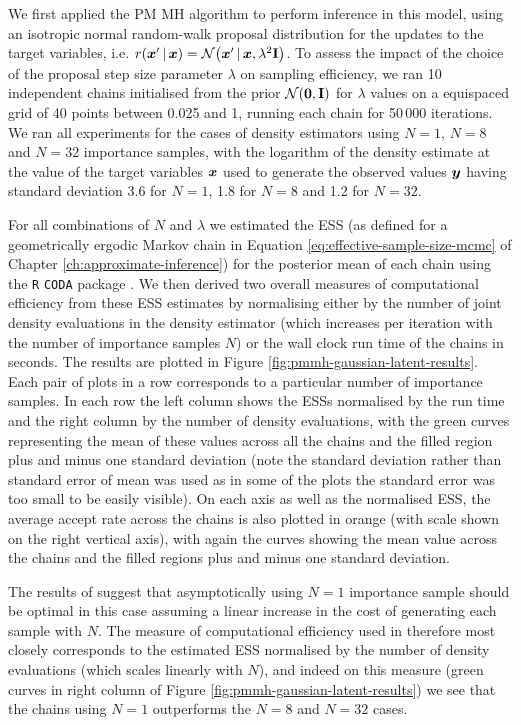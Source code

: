We first applied the \ac{PM} \ac{MH} algorithm to perform inference in this model, using an isotropic normal random-walk proposal distribution for the updates to the target variables, i.e. $r(\vct{x}'\gvn\vct{x}) = \nrm{\vct{x}'\gvn\vct{x},\lambda^2\mathbf{I}}$. To assess the impact of the choice of the proposal step size parameter $\lambda$ on sampling efficiency, we ran 10 independent chains initialised from the prior $\nrm{\vct{0},\mathbf{I}}$ for $\lambda$ values on a equispaced grid of 40 points between 0.025 and 1, running each chain for 50\,000 iterations. We ran all experiments for the cases of density estimators using $N=1$, $N=8$ and $N=32$ importance samples, with the logarithm of the density estimate at the value of the target variables $\boldsymbol{x}$ used to generate the observed values $\boldsymbol{y}$ having standard deviation 3.6 for $N=1$, 1.8 for $N=8$ and 1.2 for $N=32$.

For all combinations of $N$ and $\lambda$ we estimated the \acf{ESS} (as defined for a geometrically ergodic Markov chain in Equation \ref{eq:effective-sample-size-mcmc} of Chapter \ref{ch:approximate-inference}) for the posterior mean of each chain using the \texttt{R} \texttt{CODA} package \citep{plummer2006coda}. We then derived two overall measures of computational efficiency from these \ac{ESS} estimates by normalising either by the number of joint density evaluations in the density estimator (which increases per iteration with the number of importance samples $N$) or the wall clock run time of the chains in seconds. The results are plotted in Figure \ref{fig:pmmh-gaussian-latent-results}. Each pair of plots in a row corresponds to a particular number of importance samples. In each row the left column shows the \acp{ESS} normalised by the run time and the right column by the number of density evaluations, with the green curves representing the mean of these values across all the chains and the filled region plus and minus one standard deviation (note the standard deviation rather than standard error of mean was used as in some of the plots the standard error was too small to be easily visible). On each axis as well as the normalised \ac{ESS}, the average accept rate across the chains is also plotted in orange (with scale shown on the right vertical axis), with again the curves showing the mean value across the chains and the filled regions plus and minus one standard deviation.

The results of \citep{sherlock2016pseudo} suggest that asymptotically using $N=1$ importance sample should be optimal in this case assuming a linear increase in the cost of generating each sample with $N$. The measure of computational efficiency used in \citep{sherlock2016pseudo} therefore most closely corresponds to the estimated \ac{ESS} normalised by the number of density evaluations (which scales linearly with $N$), and indeed on this measure (green curves in right column of Figure \ref{fig:pmmh-gaussian-latent-results}) we see that the chains using $N=1$ outperforms the $N=8$ and $N=32$ cases.

